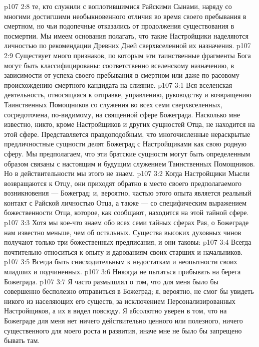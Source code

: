 \vs p107 2:8 \pc {}\bibnobreakspace {} те, кто служили с воплотившимися Райскими Сынами, наряду со многими достигшими необыкновенного отличия во время своего пребывания в смертном, но чьи подопечные отказались от продолжения существования в посмертии. Мы имеем основания полагать, что такие Настройщики наделяются личностью по рекомендации Древних Дней сверхвселенной их назначения.
\vs p107 2:9 \pc Существует много признаков, по которым эти таинственные фрагменты Бога могут быть классифицированы: соответственно вселенскому назначению, в зависимости от успеха своего пребывания в смертном или даже по расовому происхождению смертного кандидата на слияние.
\vs p107 3:1 Вся вселенская деятельность, относящаяся к отправке, управлению, руководству и возвращению Таинственных Помощников со служения во всех семи сверхвселенных, сосредоточена, по\hyp{}видимому, на священной сфере Божеграда. Насколько мне известно, никто, кроме Настройщиков и других сущностей Отца, не находится на этой сфере. Представляется правдоподобным, что многочисленные нераскрытые предличностные сущности делят Божеград с Настройщиками как свою родную сферу. Мы предполагаем, что эти братские сущности могут быть определенным образом связаны с настоящим и будущим служением Таинственных Помощников. Но в действительности мы этого не знаем.
\vs p107 3:2 Когда Настройщики Мысли возвращаются к Отцу, они приходят обратно в место своего предполагаемого возникновения --- Божеград; и, вероятно, частью этого опыта является реальный контакт с Райской личностью Отца, а также --- со специфическим выражением божественности Отца, которое, как сообщают, находится на этой тайной сфере.
\vs p107 3:3 Хотя мы кое\hyp{}что знаем обо всех семи тайных сферах Рая, о Божеграде нам известно меньше, чем об остальных. Существа высоких духовных чинов получают только три божественных предписания, и они таковы:
\vs p107 3:4 \bibnobreakspace Всегда почтительно относиться к опыту и дарованиям своих старших и начальников.
\vs p107 3:5 \bibnobreakspace Всегда быть снисходительным к недостаткам и неопытности своих младших и подчиненных.
\vs p107 3:6 \bibnobreakspace Никогда не пытаться прибывать на берега Божеграда.
\vs p107 3:7 Я часто размышлял о том, что для меня было бы совершенно бесполезно отправиться в Божеград; я, вероятно, не смог бы увидеть никого из населяющих его существ, за исключением Персонализированных Настройщиков, а их я видел повсюду. Я абсолютно уверен в том, что на Божеграде для меня нет ничего действительно ценного или полезного, ничего существенного для моего роста и развития, иначе мне не было бы запрещено бывать там.
